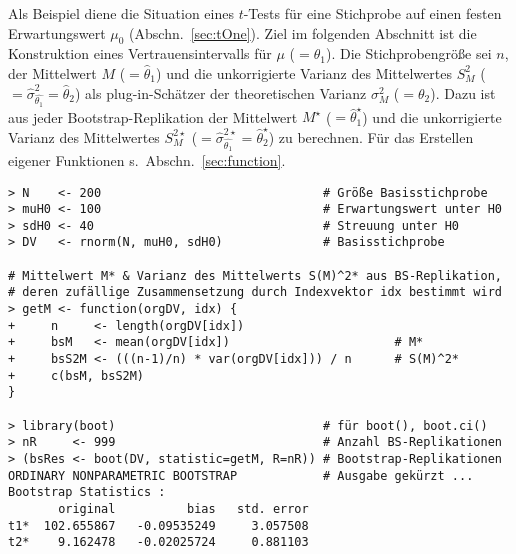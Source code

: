 Als Beispiel diene die Situation eines $t$-Tests für eine Stichprobe auf einen festen Erwartungswert $\mu_{0}$ (Abschn.\ \ref{sec:tOne}). Ziel im folgenden Abschnitt ist die Konstruktion eines Vertrauensintervalls für $\mu$ ($= \theta_{1}$). Die Stichprobengröße sei $n$, der Mittelwert $M$ ($= \hat{\theta}_{1}$) und die unkorrigierte Varianz des Mittelwertes $S_{M}^{2}$ ($= \hat{\sigma}_{\hat{\theta_{1}}}^{2} = \hat{\theta}_{2}$) als plug-in-Schätzer der theoretischen Varianz $\sigma_{M}^{2}$ ($= \theta_{2}$). Dazu ist aus jeder Bootstrap-Replikation der Mittelwert $M^{\star}$ ($= \hat{\theta}_{1}^{\star}$) und die unkorrigierte Varianz des Mittelwertes $S_{M}^{2 \star}$ ($= \hat{\sigma}_{\hat{\theta_{1}}}^{2 \star} = \hat{\theta}_{2}^{\star}$) zu berechnen. Für das Erstellen eigener Funktionen s.\ Abschn.\ \ref{sec:function}.
\begin{lstlisting}
> N    <- 200                               # Größe Basisstichprobe
> muH0 <- 100                               # Erwartungswert unter H0
> sdH0 <- 40                                # Streuung unter H0
> DV   <- rnorm(N, muH0, sdH0)              # Basisstichprobe

# Mittelwert M* & Varianz des Mittelwerts S(M)^2* aus BS-Replikation,
# deren zufällige Zusammensetzung durch Indexvektor idx bestimmt wird
> getM <- function(orgDV, idx) {
+     n     <- length(orgDV[idx])
+     bsM   <- mean(orgDV[idx])                       # M*
+     bsS2M <- (((n-1)/n) * var(orgDV[idx])) / n      # S(M)^2*
+     c(bsM, bsS2M)
}

> library(boot)                             # für boot(), boot.ci()
> nR     <- 999                             # Anzahl BS-Replikationen
> (bsRes <- boot(DV, statistic=getM, R=nR)) # Bootstrap-Replikationen
ORDINARY NONPARAMETRIC BOOTSTRAP            # Ausgabe gekürzt ...
Bootstrap Statistics :
       original          bias   std. error
t1*  102.655867   -0.09535249     3.057508
t2*    9.162478   -0.02025724     0.881103
\end{lstlisting}

